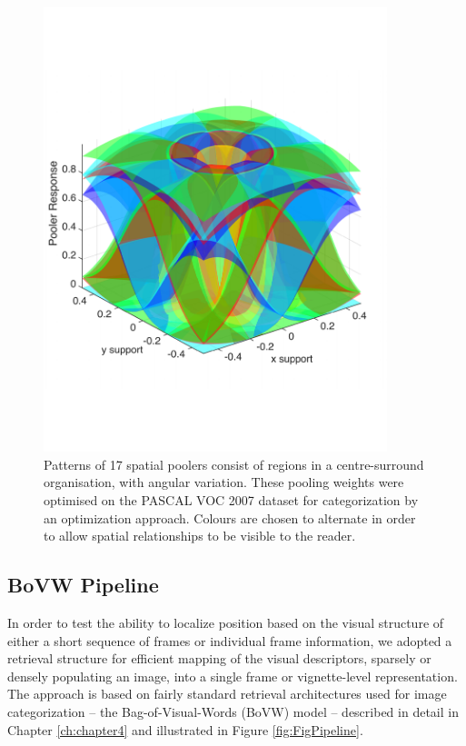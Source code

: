 
\begin{figure}[!h]
\begin{center}
\includegraphics[width=10cm,trim=0cm 3cm 0cm 3cm,clip=true]{gfx/Chapter06/PoolerResponses.pdf}
\caption{\label{fig:PoolerResponses}Patterns of 17 spatial poolers consist of regions in a centre-surround organisation, with angular variation.  These pooling weights were optimised on the PASCAL VOC 2007 dataset for categorization by an optimization approach. Colours are chosen to alternate in order to allow spatial relationships to be visible to the reader.}
\end{center}
\end{figure}

\subsection{BoVW Pipeline}
In order to test the ability to localize position based on the visual structure of either a short sequence of frames or individual frame information, we adopted a retrieval structure for efficient mapping of the visual descriptors, sparsely or densely populating an image,  into a single frame or vignette-level representation.  The approach is based on fairly standard retrieval architectures used for image categorization -- the Bag-of-Visual-Words (BoVW) model -- described in detail in Chapter \ref{ch:chapter4} and illustrated in Figure \ref{fig:FigPipeline}.

